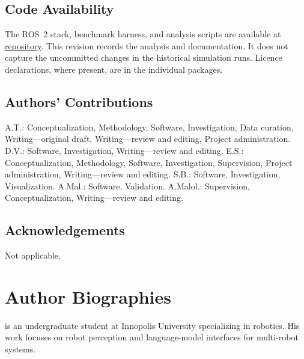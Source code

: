 \documentclass[pdflatex,sn-mathphys-num]{sn-jnl}
\let\unpatchedsection\section
\begin{document}
\subsection*{Code Availability}
The ROS~2 stack, benchmark harness, and analysis scripts are available at
\href{https://github.com/Innopolis-Robotics-Society/llm_swarm/}{repository}.
This revision records the analysis and documentation. It does not
capture the uncommitted changes in the historical simulation runs.
Licence declarations, where present, are in the individual packages.

\subsection*{Authors' Contributions}
A.T.: Conceptualization, Methodology, Software, Investigation, Data curation,
Writing---original draft, Writing---review and editing, Project administration.
D.V.: Software, Investigation, Writing---review and editing.
E.S.: Conceptualization, Methodology, Software, Investigation, Supervision,
Project administration, Writing---review and editing.
S.B.: Software, Investigation, Visualization.
A.Mal.: Software, Validation.
A.Malol.: Supervision, Conceptualization, Writing---review and editing.

\subsection*{Acknowledgements}
Not applicable.


\begingroup
\let\section\unpatchedsection
\setlength{\bibsep}{0.5em}

\endgroup

\clearpage
\section*{Author Biographies}

\begin{biography}{}{\author{Artem Tuzov} is an undergraduate student at
Innopolis University specializing in robotics. His work focuses on robot
perception and language-model interfaces for multi-robot systems.}
\end{biography}
\end{document}
